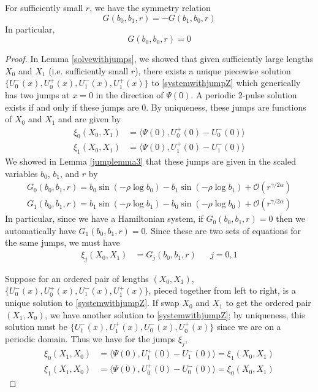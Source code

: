 \documentclass[thesis.tex]{subfiles}
\begin{document}
\begin{lemma}\label{Gsymm}
For sufficiently small $r$, we have the symmetry relation
\begin{equation}
G(b_0, b_1, r) = -G(b_1, b_0, r)
\end{equation}
In particular, 
\[
G(b_0, b_0, r) = 0
\]
\begin{proof}
In Lemma \ref{solvewithjumps}, we showed that given sufficiently large lengths $X_0$ and $X_1$ (i.e. sufficiently small $r$), there exists a unique piecewise solution $\{ U_0^-(x), U_0^+(x), U_1^-(x), U_1^+(x) \}$ to \eqref{systemwithjumpZ} which generically has two jumps at $x = 0$ in the direction of $\Psi(0)$. A periodic 2-pulse solution exists if and only if these jumps are 0. By uniqueness, these jumps are functions of $X_0$ and $X_1$ and are given by
\begin{equation}\label{xijumps}
\begin{aligned}
\xi_0(X_0, X_1) &= \langle \Psi(0), U_0^+(0) - U_0^-(0) \rangle  \\
\xi_1(X_0, X_1) &= \langle \Psi(0), U_1^+(0) - U_1^-(0) \rangle 
\end{aligned}
\end{equation}
We showed in Lemma \ref{jumplemma3} that these jumps are given in the scaled variables $b_0$, $b_1$, and $r$ by
\begin{equation}\label{G0G1}
\begin{aligned}
G_0(b_0, b_1, r) = b_0 \sin \left( -\rho \log b_0 \right) - b_1 \sin \left( -\rho \log b_1 \right) + \mathcal{O}(r^{\gamma / 2 \alpha}) \\
G_1(b_0, b_1, r) = b_1 \sin \left( -\rho \log b_1 \right) - b_0 \sin \left( -\rho \log b_0 \right) + \mathcal{O}(r^{\gamma / 2 \alpha}) 
\end{aligned}
\end{equation}
In particular, since we have a Hamiltonian system, if $G_0(b_0, b_1, r) = 0$ then we automatically have $G_1(b_0, b_1, r) = 0$. Since these are two sets of equations for the same jumps, we must have 
\begin{align}\label{xiGequiv}
\xi_j(X_0, X_1) &= G_j(b_0, b_1, r) && j = 0, 1
\end{align} 

Suppose for an ordered pair of lengths $(X_0, X_1)$, $\{ U_0^-(x), U_0^+(x), U_1^-(x), U_1^+(x) \}$, pieced together from left to right, is a unique solution to \eqref{systemwithjumpZ}. If swap $X_0$ and $X_1$ to get the ordered pair $(X_1, X_0)$, we have another solution to \eqref{systemwithjumpZ}; by uniqueness, this solution must be $\{ U_1^-(x), U_1^+(x), U_0^-(x), U_0^+(x)\}$ since we are on a periodic domain. Thus we have for the jumps $\xi_j$,
\begin{equation}\label{xiswapX}
\begin{aligned}
\xi_0(X_1, X_0) &= \langle \Psi(0), U_1^+(0) - U_1^-(0) \rangle = \xi_1(X_0, X_1) \\
\xi_1(X_1, X_0) &= \langle \Psi(0), U_0^+(0) - U_0^-(0) \rangle = \xi_0(X_0, X_1)
\end{aligned}
\end{equation}


\end{proof}
\end{lemma}
\end{document}
